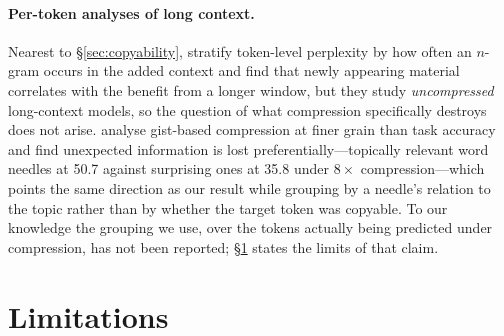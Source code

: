\documentclass[11pt]{article}
\begin{document}
\paragraph{Per-token analyses of long context.}
Nearest to \S\ref{sec:copyability}, \citet{tokensbenefit} stratify token-level
perplexity by how often an $n$-gram occurs in the added context and find that
newly appearing material correlates with the benefit from a longer window, but
they study \emph{uncompressed} long-context models, so the question of what
compression specifically destroys does not arise. \citet{gistboundary} analyse
gist-based compression at finer grain than task accuracy and find unexpected
information is lost preferentially---topically relevant word needles at 50.7
against surprising ones at 35.8 under $8\times$ compression---which points the
same direction as our result while grouping by a needle's relation to the topic
rather than by whether the target token was copyable. To our knowledge the
grouping we use, over the tokens actually being predicted under compression, has
not been reported; \S\ref{sec:limitations} states the limits of that claim.

\section{Limitations}
\label{sec:limitations}
\end{document}
